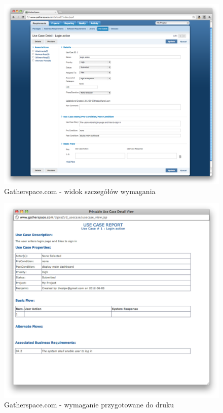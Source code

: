       \begin{figure}[t]
        \centering
        \includegraphics[width=1.0\textwidth]{img/gatherspace_8.pdf}
        \caption{Gatherspace.com - widok szczegółów wymagania}
        \label{fig:gatherspace_8}
      \end{figure}

      \begin{figure}[t]
        \centering
        \includegraphics[width=1.0\textwidth]{img/gatherspace_9.pdf}
        \caption{Gatherspace.com - wymaganie przygotowane do druku}
        \label{fig:gatherspace_9}
      \end{figure}

